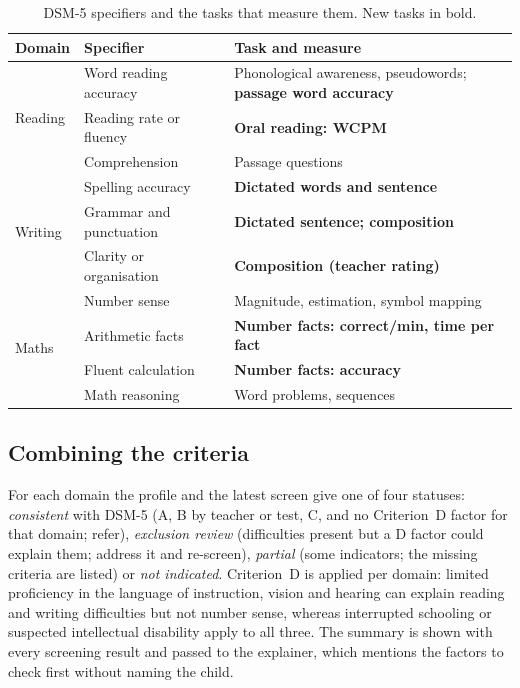 \documentclass[conference]{IEEEtran}
\begin{document}
\begin{table}[!t]
\centering
\caption{DSM-5 specifiers and the tasks that measure them. New tasks in bold.}
\label{tab:specifiers}
\footnotesize
\setlength{\tabcolsep}{3pt}
\begin{tabular}{@{}lp{2.6cm}p{4.0cm}@{}}
\toprule
Domain & Specifier & Task and measure \\
\midrule
\multirow{3}{*}{Reading} & Word reading accuracy & Phonological awareness, pseudowords; \textbf{passage word accuracy} \\
 & Reading rate or fluency & \textbf{Oral reading: WCPM} \\
 & Comprehension & Passage questions \\
\midrule
\multirow{3}{*}{Writing} & Spelling accuracy & \textbf{Dictated words and sentence} \\
 & Grammar and punctuation & \textbf{Dictated sentence; composition} \\
 & Clarity or organisation & \textbf{Composition (teacher rating)} \\
\midrule
\multirow{4}{*}{Maths} & Number sense & Magnitude, estimation, symbol mapping \\
 & Arithmetic facts & \textbf{Number facts: correct/min, time per fact} \\
 & Fluent calculation & \textbf{Number facts: accuracy} \\
 & Math reasoning & Word problems, sequences \\
\bottomrule
\end{tabular}
\end{table}

\subsection{Combining the criteria}
For each domain the profile and the latest screen give one of four statuses:
\emph{consistent} with DSM-5 (A, B by teacher or test, C, and no Criterion~D factor
for that domain; refer), \emph{exclusion review} (difficulties present but a D factor
could explain them; address it and re-screen), \emph{partial} (some indicators; the
missing criteria are listed) or \emph{not indicated}. Criterion~D is applied per
domain: limited proficiency in the language of instruction, vision and hearing can
explain reading and writing difficulties but not number sense, whereas interrupted
schooling or suspected intellectual disability apply to all three. The summary is
shown with every screening result and passed to the explainer, which mentions the
factors to check first without naming the child.
\end{document}
